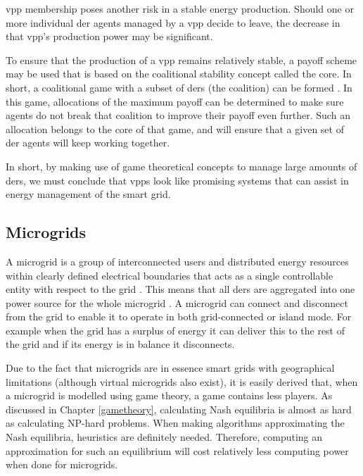 \ac{vpp} membership poses another risk in a stable energy production. Should one or more individual \ac{der} agents managed by a \ac{vpp} decide to leave, the decrease in that \ac{vpp}'s production power may be significant. 

To ensure that the production of a \ac{vpp} remains relatively stable, a payoff scheme may be used that is based on the coalitional stability concept called the core. In short, a coalitional game with a subset of \acp{der} (the coalition) can be formed \cite{MihailescuVasiraniOssowski2011}. In this game, allocations of the maximum payoff can be determined to make sure agents do not break that coalition to improve their payoff even further\cite{ChalkiadakisRobuKotaEtAl2011, YeungPoonWu1999, SaadHanPoor2011}. Such an allocation belongs to the core of that game, and will ensure that a given set of \ac{der} agents will keep working together.

In short, by making use of game theoretical concepts to manage large amounts of \acp{der}, we must conclude that \acp{vpp} look like promising systems that can assist in energy management of the smart grid. 

\subsection{Microgrids}\label{microgrids}
A microgrid is a group of interconnected users and distributed energy resources within clearly defined electrical boundaries that acts as a single controllable entity with respect to the grid \cite{ParhiziLotfiKhodaeiEtAl2015}. This means that all \acp{der} are aggregated into one power source for the whole microgrid \cite{KanchevLuColasEtAl2011}. A microgrid can connect and disconnect from the grid to enable it to operate in both grid-connected or island mode. For example when the grid has a surplus of energy it can deliver this to the rest of the grid and if its energy is in balance it disconnects. 

Due to the fact that microgrids are in essence smart grids with geographical limitations (although virtual microgrids also exist), it is easily derived that, when a microgrid is modelled using game theory, a game contains less players. As discussed in Chapter \ref{gametheory}, calculating Nash equilibria is almost as hard as calculating NP-hard problems. When making algorithms approximating the Nash equilibria, heuristics are definitely needed. Therefore, computing an approximation for such an equilibrium will cost relatively less computing power when done for microgrids. 

